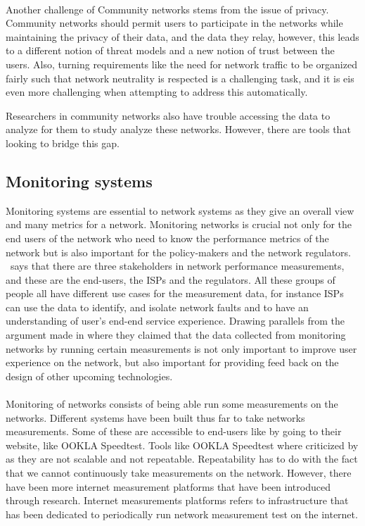 \paragraph{}
Another challenge of Community networks stems from the issue of privacy.
Community networks should permit users to participate in the networks while maintaining the privacy of their data, and the data they relay, however, this leads to a different notion of threat models and a new notion of trust between the users\cite{Braem:2013:CRC:2500098.2500108}.
Also, turning requirements like the need for network traffic to be organized fairly such that network neutrality is respected is a challenging task, and it is eis even more challenging when attempting to address this automatically\cite{Braem:2013:CRC:2500098.2500108}.

Researchers in community networks also have trouble accessing the data to analyze for them to study analyze these networks.
However, there are tools that looking to bridge this gap.
\subsection{Monitoring systems}\label{subsec:monitoring-systems}
Monitoring systems are essential to network systems as they give an overall view and many metrics for a network.
Monitoring networks is crucial not only for the end users of the network who need to know the performance metrics of the network but is also important for the policy-makers and the network regulators\cite{7523537}.
~\cite{7076582}says that there are three stakeholders in network performance measurements, and these are the end-users, the ISPs and the regulators.
All these groups of people all have different use cases for the measurement data, for instance ISPs can use the data to identify, and isolate network faults and to have an understanding of user's end-end service experience\cite{Ford:2018:RWR:3243157.3243167}.
Drawing parallels from the argument made in\cite{7523537} where they claimed that the data collected from monitoring networks by running certain measurements is not only important to improve user experience on the network, but also important for providing feed back on the design of other upcoming technologies\cite{7523537}.
\paragraph{}
Monitoring of networks consists of being able run some measurements on the networks.
Different systems have been built thus far to take networks measurements.
Some of these are accessible to end-users like by going to their website, like OOKLA Speedtest\cite{7523537}.
Tools like OOKLA Speedtest where criticized by\cite{7523537} as they are not scalable and not repeatable.
Repeatability has to do with the fact that we cannot continuously take measurements on the network.
However, there have been more internet measurement platforms that have been introduced through research.
Internet measurements platforms refers to infrastructure that has been dedicated to periodically run network measurement test on the internet\cite{7076582}.
